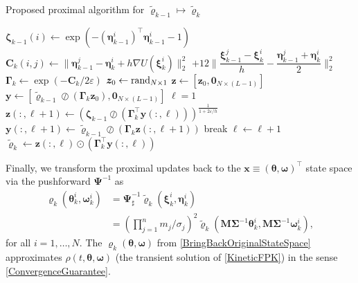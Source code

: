 \documentclass[10pt,twocolumn]{IEEEtran}
\begin{document}
\begin{algorithm}[t]
\caption{Proposed proximal algorithm for $\tilde{\bm{\varrho}}_{k-1}\mapsto\tilde{\bm{\varrho}}_{k}$}
\label{algo:KineticProx}
\begin{algorithmic}[1]
\State $\bm{\zeta}_{k-1}(i) \gets \exp\left(-\left(\bm{\eta}_{k-1}^{i}\right)^{\top}\bm{\eta}_{k-1}^{i}-1\right)$
\State $\bm{C}_{k}(i,j) \gets \parallel\bm{\eta}_{k-1}^{j} - \bm{\eta}_{k}^{i}+ h\nabla U(\bm{\xi}_{k}^{i})\parallel_{2}^{2}$
\State \qquad\quad $+12\bigg\|\dfrac{\bm{\xi}_{k-1}^{j}-\bm{\xi}_{k}^{i}}{h} - \dfrac{\bm{\eta}_{k-1}^{j} + \bm{\eta}_{k}^{i}}{2}\bigg\|_{2}^{2}$
\EndFor
\EndFor
\State $\bm{\Gamma}_{k} \gets \exp\left(-\bm{C}_{k}/2\varepsilon\right)$ 
\State $\bm{z}_{0} \gets {\rm{rand}}_{N\times 1}$ 
\State $\bm{z} \gets \left[\bm{z}_{0}, \bm{0}_{N\times(L-1)}\right]$ 
\State $\bm{y} \gets \left[\tilde{\bm{\varrho}}_{k-1}\oslash\left(\bm{\Gamma}_{k}\bm{z}_{0}\right), \bm{0}_{N\times(L-1)}\right]$ 
\State $\ell = 1$
\State $\bm{z}(:,\ell+1) \gets \left(\bm{\zeta}_{k-1}\oslash\left(\bm{\Gamma}_{k}^{\top}\bm{y}(:,\ell)\right)\right)^{\frac{1}{1+2\varepsilon/h}}$
\State $\bm{y}(:,\ell+1) \gets \tilde{\bm{\varrho}}_{k-1} \oslash \left(\bm{\Gamma}_{k}\bm{z}(:,\ell+1)\right)$
 
\State break
\Else
\State $\ell \gets \ell + 1$
\EndIf
\EndWhile\\
\Return $\tilde{\bm{\varrho}}_{k} \gets \bm{z}(:,\ell) \odot \left(\bm{\Gamma}_{k}^{\top}\bm{y}(:,\ell)\right)$ 
\EndProcedure	
\end{algorithmic}
\end{algorithm}





Finally, we transform the proximal updates back to the $\bm{x}\equiv\left(\bm{\theta},\bm{\omega}\right)^{\top}$ state space via the pushforward $\bm{\Psi}^{-1}$ as
\begin{align}
\varrho_{k}\left(\bm{\theta}_{k}^{i},\bm{\omega}_{k}^{i}\right) &= \bm{\Psi}^{-1}_{\sharp} \tilde{\varrho}_{k}\left(\bm{\xi}_{k}^{i},\bm{\eta}_{k}^{i}\right) \nonumber\\
&= \left(\prod_{j=1}^{n}m_{j}/\sigma_{j}\right)^{\!\!2}\tilde{\varrho}_{k}\left(\bm{M}\bm{\Sigma}^{-1}\bm{\theta}_{k}^{i},\bm{M}\bm{\Sigma}^{-1}\bm{\omega}_{k}^{i}\right),
\label{BringBackOriginalStateSpace}	
\end{align}
for all $i=1,\hdots,N$. The $\varrho_{k}\left(\bm{\theta},\bm{\omega}\right)$ from \eqref{BringBackOriginalStateSpace} approximates $\rho(t,\bm{\theta},\bm{\omega})$ (the transient solution of \eqref{KineticFPK}) in the sense \eqref{ConvergenceGuarantee}. 
\end{document}
